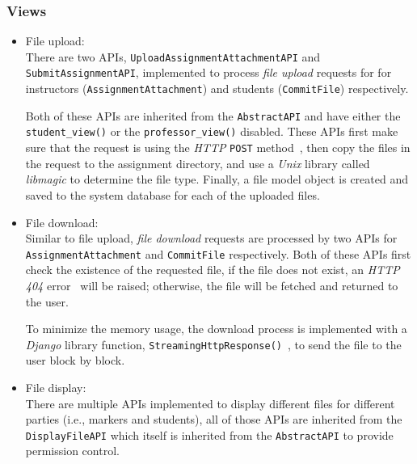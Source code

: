 \subsubsection{Views}
\begin{itemize}
    \item File upload: \\
    There are two APIs, 
    \texttt{Upload\-Assign\-ment\-Attach\-ment\-API} and
    \texttt{Sub\-mit\-Assign\-ment\-API}, 
    implemented to process \emph{file upload} requests for
    for instructors (\texttt{Assign\-ment\-Attach\-ment}) and students
    (\texttt{CommitFile}) respectively.

    Both of these APIs are inherited from the 
    \texttt{AbstractAPI} and have either the \texttt{student\_view()}
    or the \texttt{professor\_view()} disabled.
    These APIs first make sure that the request is using the
    \emph{HTTP} \texttt{POST} method~\citep[Section 4.3.3]{http},
    then copy the files in the request to the assignment directory, and use 
    a \emph{Unix} library called \emph{libmagic} \cite{libmagic} to determine
    the file type.
    Finally, a file model object is created and saved to the system database
    for each of the uploaded files.

    \item File download: \\
    Similar to file upload, \emph{file download} requests are processed by
    two APIs for \texttt{AssignmentAttachment} and \texttt{CommitFile}
    respectively.
    Both
    of these APIs first check the existence of the requested file, if the file
    does not exist, an \emph{HTTP 404} error~\citep[Section 6.5.4]{http} will be
    raised; otherwise, the
    file will be fetched and returned to the user.

    To minimize the memory usage, the download process is implemented with
    a \emph{Django} library function,
    \texttt{StreamingHttpResponse()}~\citep[Section Streaming\-Http\-Response
    objects]{djangoRequest},
    to send the file to the user block by block.

    \item File display: \\
    There are multiple APIs implemented to display different files for different
    parties
    (i.e., markers and students), all of those APIs are inherited from the
    \texttt{DisplayFileAPI} which itself is inherited from the
    \texttt{AbstractAPI} to provide permission control.


\end{itemize}
